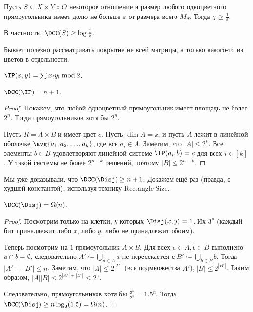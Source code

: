 \begin{lemma}
    Пусть $S \subseteq X \times Y \times O$ некоторое отношение и размер любого одноцветного
    прямоугольника имеет долю не больше $\varepsilon$ от размера всего $M_S$. Тогда $\chi \ge
    \frac{1}{\varepsilon}$.

    В частности, $\DCC(S) \ge \log \frac{1}{\varepsilon}$.
\end{lemma}

\begin{remark}
    Бывает полезно рассматривать покрытие не всей матрицы, а только какого-то из цветов в отдельности.
\end{remark}

$\IP(x, y) = \sum x_iy_i \bmod 2$.

\begin{theorem}
    $\DCC(\IP) = n + 1$.
\end{theorem}

\begin{proof}
    Покажем, что любой одноцветный прямоугольник имеет площадь не более $2^n$. Тогда прямоугольников хотя
    бы $2^n$.

    Пусть $R = A \times B$ и имеет цвет $c$. Пусть $\dim A = k$, и пусть $A$ лежит в линейной оболочке
    $\avg{a_1, a_2, \dots, a_k}$, где все $a_i \in A$. Заметим, что $|A| \le 2^k$. Все элементы $b \in B$
    удовлетворяют линейной системе $\IP(a_i, b) = c$ для всех $i \in [k]$. У такой системы не более
    $2^{n - k}$ решений, поэтому $|B| \le 2^{n - k}$.
\end{proof}

Мы уже доказывали, что $\DCC(\Disj) \ge n + 1$. Докажем ещё раз (правда, с худшей константой), используя
технику Rectangle Size.

\begin{theorem}
    $\DCC(\Disj) = \Omega(n)$.
\end{theorem}

\begin{proof}
    Посмотрим только на клетки, у которых $\Disj(x, y) = 1$. Их $3^n$ (каждый бит принадлежит либо $x$,
    либо $y$, либо не принадлежит обоим).

    Теперь посмотрим на $1$-прямоугольник $A \times B$. Для всех $a \in A, b \in B$ выполнено $a \cap
    b = \emptyset$, следовательно $A' \coloneqq \bigcup\limits_{a \in A} a$ не пересекается с
    $B' \coloneqq \bigcup\limits_{b \in B} b$. Тогда $|A'| + |B'| \le n$. Заметим, что $|A| \le 2^{|A'|}$
    (все подмножества $A'$), $|B| \le 2^{|B'|}$. Таким образом, $|A||B| \le 2^{|A'| + |B'|} \le 2^n$.

    Следовательно, прямоугольников хотя бы $\frac{3^n}{2^n} = 1.5^n$. Тогда $\DCC(\Disj) \ge
    n \log_2 (1.5) = \Omega(n)$.
\end{proof}

